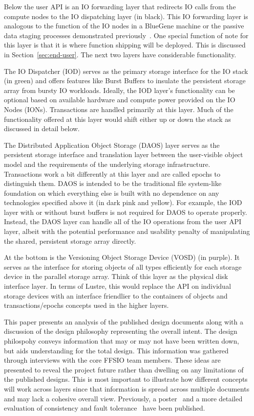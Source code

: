 \documentclass[conference]{IEEEtran} \pdfpagewidth=8.5in
\begin{document}
Below the user API is an IO forwarding layer that redirects IO calls from the
compute nodes to the IO dispatching layer (in black).  This IO forwarding layer
is analogous to the function of the IO nodes in a BlueGene machine or the
passive data staging processes demonstrated
previously~\cite{nisar:2008:staging,Abbasi:2009:datatap}. One special function
of note for this layer is that it is where function shipping will be deployed.
This is discussed in Section~\ref{sec:end-user}. The next two layers have
considerable functionality.

The IO Dispatcher (IOD) serves as the primary storage interface for the IO
stack (in green) and offers features like Burst Buffers to insulate the
persistent storage array from bursty IO workloads.  Ideally, the IOD layer's
functionality can be optional based on available hardware and compute power
provided on the IO Nodes (IONs). Transactions are handled primarily at this
layer. Much of the functionality offered at this layer would shift either up or
down the stack as discussed in detail below.

The Distributed Application Object Storage (DAOS) layer serves as the
persistent storage interface and translation layer between the user-visible
object model and the requirements of the underlying storage infrastructure. 
Transactions work a bit differently at this layer and are called epochs to
distinguish them. DAOS is intended to be the traditional file system-like
foundation on which everything else is built with no dependence on any
technologies specified above it (in dark pink and yellow). For example, the IOD
layer with or without burst buffers is not required for DAOS to operate
properly.  Instead, the DAOS layer can handle all of the IO operations from the
user API layer, albeit with the potential performance and usability penalty of
manipulating the shared, persistent storage array directly.

At the bottom is the Versioning Object Storage Device (VOSD) (in purple).  It
serves as the interface for storing objects of all types efficiently for each
storage device in the parallel storage array. Think of this layer as the
physical disk interface layer. In terms of Lustre, this would replace the API
on individual storage devices with an interface friendlier to the containers of
objects and transactions/epochs concepts used in the higher layers.

This paper presents an analysis of the published design documents along with a
discussion of the design philosophy representing the overall intent. The design
philospohy conveys information that may or may not have been written down, but
aids understanding for the total design.  This information was gathered through
interviews with the core FFSIO team members. These ideas are presented to
reveal the project future rather than dwelling on any limitations of the
published designs. This is most important to illustrate how different concepts
will work across layers since that information is spread across multiple
documents and may lack a cohesive overall view. Previously, a
poster~\cite{lofstead:2014:ffsio-poster} and a more detailed evaluation of
consistency and fault tolerance~\cite{lofstead:2014:ffsio-consistency} have
been published.
\end{document}
